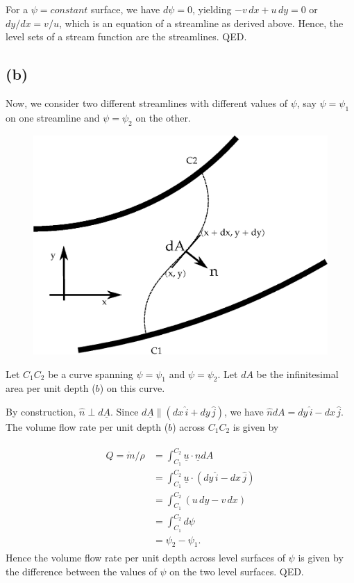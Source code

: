 \documentclass{article}
\begin{document}
For a $\psi = constant$ surface, we have $d\psi = 0$, yielding $-v \, dx + u \, dy = 0$ or $dy/dx = v/u$, which is an equation of a streamline as derived above. Hence, the level sets of a stream function are the streamlines. QED. 
\subsection*{(b)}

Now, we consider two different streamlines with different values of $\psi$, say $\psi = \psi_{1}$ on one streamline and $\psi = \psi_{2}$ on the other. 

\begin{figure}[H]
    \centering
    \includegraphics[scale = 0.4]{Figs/across_streamlines.eps}
    \caption{}
    \label{fig:across_streamlines}
\end{figure}
Let $C_{1}C_{2}$ be a curve spanning $\psi=\psi_{1}$ and $\psi=\psi_{2}$. Let $dA$ be the infinitesimal area per unit depth ($b$) on this curve. 

By construction, $\hat{n} \perp d\underline{A}$. Since $d\underline{A} \parallel (dx \, \hat{i} + dy \, \hat{j})$, we have $\hat{n} dA = dy \, \hat{i} - dx \, \hat{j}$. 
The volume flow rate per unit depth ($b$) across $C_{1}C_{2}$ is given by 

\begin{align}
 \begin{split}
  Q = \dot{m}/\rho &= \int_{C_{1}}^{C_{2}} \underline{u}\cdot \underline{n} dA \\
  &= \int_{C_{1}}^{C_{2}} \underline{u}\cdot (dy \, \hat{i} - dx \, \hat{j}) \\
  &= \int_{C_{1}}^{C_{2}}(u \, dy - v\, dx) \\
  &= \int_{C_{1}}^{C_{2}} d\psi \\
  &= \psi_{2} - \psi_{1}.
 \end{split}
\end{align}
Hence the volume flow rate per unit depth across level surfaces of $\psi$ is given by the difference between the values of $\psi$ on the two level surfaces. QED.
\end{document}
